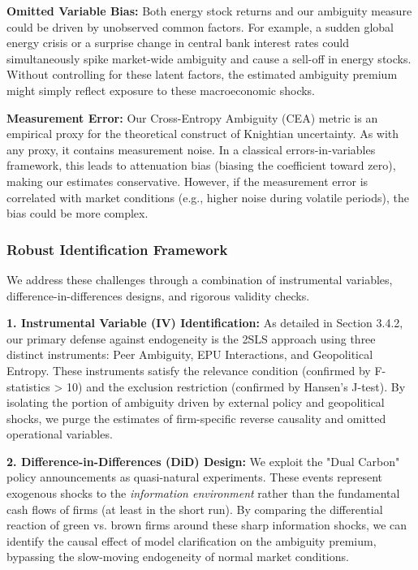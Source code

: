 \documentclass[preprint,12pt,authoryear]{elsarticle}
\begin{document}
\textbf{Omitted Variable Bias:} Both energy stock returns and our ambiguity measure could be driven by unobserved common factors. For example, a sudden global energy crisis or a surprise change in central bank interest rates could simultaneously spike market-wide ambiguity and cause a sell-off in energy stocks. Without controlling for these latent factors, the estimated ambiguity premium might simply reflect exposure to these macroeconomic shocks.

\textbf{Measurement Error:} Our Cross-Entropy Ambiguity (CEA) metric is an empirical proxy for the theoretical construct of Knightian uncertainty. As with any proxy, it contains measurement noise. In a classical errors-in-variables framework, this leads to attenuation bias (biasing the coefficient toward zero), making our estimates conservative. However, if the measurement error is correlated with market conditions (e.g., higher noise during volatile periods), the bias could be more complex.

\subsubsection{Robust Identification Framework}

We address these challenges through a combination of instrumental variables, difference-in-differences designs, and rigorous validity checks.

\textbf{1. Instrumental Variable (IV) Identification:} As detailed in Section 3.4.2, our primary defense against endogeneity is the 2SLS approach using three distinct instruments: Peer Ambiguity, EPU Interactions, and Geopolitical Entropy. These instruments satisfy the relevance condition (confirmed by F-statistics > 10) and the exclusion restriction (confirmed by Hansen's J-test). By isolating the portion of ambiguity driven by external policy and geopolitical shocks, we purge the estimates of firm-specific reverse causality and omitted operational variables.

\textbf{2. Difference-in-Differences (DiD) Design:} We exploit the "Dual Carbon" policy announcements as quasi-natural experiments. These events represent exogenous shocks to the \textit{information environment} rather than the fundamental cash flows of firms (at least in the short run). By comparing the differential reaction of green vs. brown firms around these sharp information shocks, we can identify the causal effect of model clarification on the ambiguity premium, bypassing the slow-moving endogeneity of normal market conditions.
\end{document}
